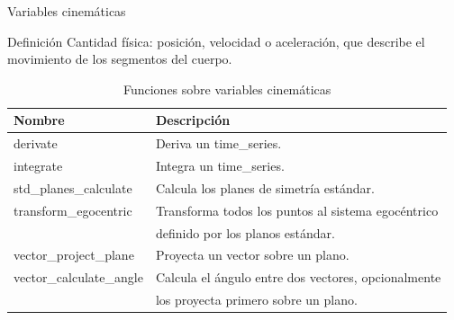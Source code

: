 \documentclass[aspectratio=169,spanish]{beamer} %
\newcommand{\mono}[1]{{\ttfamily #1}}
\begin{document}
\begin{frame}{Variables cinemáticas}
    \begin{block}{Definición}
        Cantidad física: posición, velocidad o aceleración, que describe el movimiento de los segmentos del cuerpo.
    \end{block}
\begin{table}
    \centering
    \caption{Funciones sobre variables cinemáticas}
    \label{tab:kinematics}
    \scriptsize
    \begin{tabular}{ll}
        \toprule
        Nombre & Descripción \\
        \midrule
        \mono{derivate} & Deriva un \mono{time\_series}. \\
        \mono{integrate} & Integra un \mono{time\_series}. \\
        \mono{std\_planes\_calculate} & Calcula los planes de simetría estándar. \\
        \mono{transform\_egocentric} & Transforma todos los puntos al sistema egocéntrico \\ & definido por los planos estándar. \\
        \mono{vector\_project\_plane} & Proyecta un vector sobre un plano. \\
        \mono{vector\_calculate\_angle} & Calcula el ángulo entre dos vectores, opcionalmente \\ & los proyecta primero sobre un plano. \\
        \bottomrule
    \end{tabular}
\end{table}
\end{frame}
\end{document}

